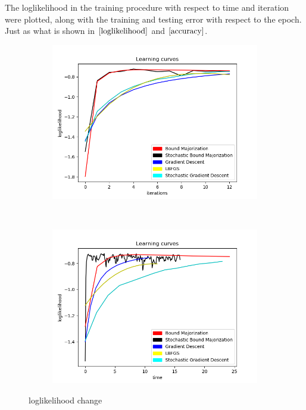 \documentclass{article}
\begin{document}
The loglikelihood in the training procedure with respect to time and iteration were plotted, along with the training and testing error
with respect to the epoch. Just as what is shown in $\ref{loglikelihood}$ and $\ref{accuracy}$.

\begin{figure}[htbp]
  \centering
  \begin{subfigure}[b]{0.45\textwidth}
      \includegraphics[width=\textwidth]{iterations}
      \caption{}
      \label{iteration}
  \end{subfigure}
  ~ %
  \begin{subfigure}[b]{0.45\textwidth}
      \includegraphics[width=\textwidth]{time}
      \caption{}
      \label{time}
  \end{subfigure}

  \caption{loglikelihood change}\label{loglikelihood}
\end{figure}
\end{document}
